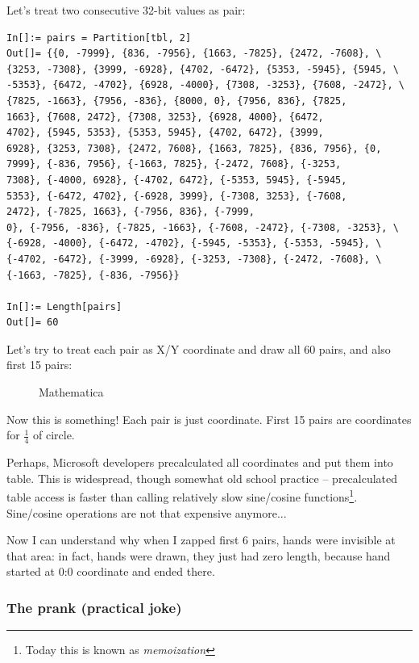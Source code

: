 Let's treat two consecutive 32-bit values as pair:

\begin{lstlisting}[style=custommath]
In[]:= pairs = Partition[tbl, 2]
Out[]= {{0, -7999}, {836, -7956}, {1663, -7825}, {2472, -7608}, \
{3253, -7308}, {3999, -6928}, {4702, -6472}, {5353, -5945}, {5945, \
-5353}, {6472, -4702}, {6928, -4000}, {7308, -3253}, {7608, -2472}, \
{7825, -1663}, {7956, -836}, {8000, 0}, {7956, 836}, {7825, 
1663}, {7608, 2472}, {7308, 3253}, {6928, 4000}, {6472, 
4702}, {5945, 5353}, {5353, 5945}, {4702, 6472}, {3999, 
6928}, {3253, 7308}, {2472, 7608}, {1663, 7825}, {836, 7956}, {0, 
7999}, {-836, 7956}, {-1663, 7825}, {-2472, 7608}, {-3253, 
7308}, {-4000, 6928}, {-4702, 6472}, {-5353, 5945}, {-5945, 
5353}, {-6472, 4702}, {-6928, 3999}, {-7308, 3253}, {-7608, 
2472}, {-7825, 1663}, {-7956, 836}, {-7999, 
0}, {-7956, -836}, {-7825, -1663}, {-7608, -2472}, {-7308, -3253}, \
{-6928, -4000}, {-6472, -4702}, {-5945, -5353}, {-5353, -5945}, \
{-4702, -6472}, {-3999, -6928}, {-3253, -7308}, {-2472, -7608}, \
{-1663, -7825}, {-836, -7956}}

In[]:= Length[pairs]
Out[]= 60
\end{lstlisting}

Let's try to treat each pair as X/Y coordinate and draw all 60 pairs, and also first 15 pairs:

\begin{figure}[H]
\centering
{}
\caption{Mathematica}
\end{figure}

Now this is something!
Each pair is just coordinate.
First 15 pairs are coordinates for $\frac{1}{4}$ of circle.

Perhaps, Microsoft developers precalculated all coordinates and put them into table.
This is widespread, though somewhat old school practice -- precalculated table access is faster than calling relatively slow sine/cosine functions\footnote{Today this is known
as \emph{memoization}}.
Sine/cosine operations are not that expensive anymore...

Now I can understand why when I zapped first 6 pairs, hands were invisible at that area: in fact, hands were drawn,
they just had zero length, because hand started at 0:0 coordinate and ended there.

\subsubsection{The prank (practical joke)}

